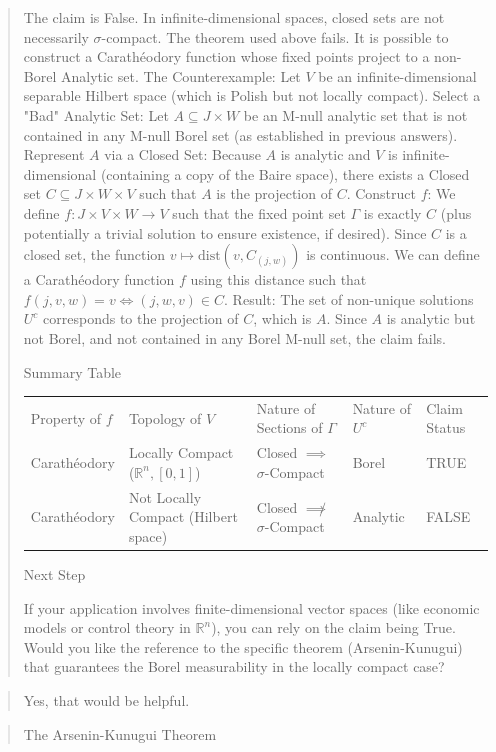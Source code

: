 \begin{Rem}
{\begin{quote}
The claim is False.
In infinite-dimensional spaces, closed sets are not necessarily $\sigma$-compact. The theorem used above fails. It is possible to construct a Carathéodory function whose fixed points project to a non-Borel Analytic set.
The Counterexample:
Let $V$ be an infinite-dimensional separable Hilbert space (which is Polish but not locally compact).
Select a "Bad" Analytic Set: Let $A \subseteq J \times W$ be an M-null analytic set that is not contained in any M-null Borel set (as established in previous answers).
Represent $A$ via a Closed Set:
Because $A$ is analytic and $V$ is infinite-dimensional (containing a copy of the Baire space), there exists a Closed set $C \subseteq J \times W \times V$ such that $A$ is the projection of $C$.
Construct $f$:
We define $f: J \times V \times W \to V$ such that the fixed point set $\Gamma$ is exactly $C$ (plus potentially a trivial solution to ensure existence, if desired).
Since $C$ is a closed set, the function $v \mapsto \text{dist}(v, C_{(j,w)})$ is continuous. We can define a Carathéodory function $f$ using this distance such that $f(j,v,w)=v \iff (j,w,v) \in C$.
Result:
The set of non-unique solutions $U^c$ corresponds to the projection of $C$, which is $A$.
Since $A$ is analytic but not Borel, and not contained in any Borel M-null set, the claim fails.

Summary Table

      \begin{tabular}{lllll}
      Property of $f$ & Topology of $V$ & Nature of Sections of $\Gamma$ & Nature of $U^c$ & Claim Status \\
        Carath\'eodory & Locally Compact ($\mathbb{R}^n, [0,1]$) & Closed $\implies$ $\sigma$-Compact & Borel & TRUE \\
        Carath\'eodory & Not Locally Compact (Hilbert space) & Closed $\not\implies$ $\sigma$-Compact & Analytic & FALSE
      \end{tabular}

Next Step

If your application involves finite-dimensional vector spaces (like economic models or control theory in $\mathbb{R}^n$), you can rely on the claim being True. Would you like the reference to the specific theorem (Arsenin-Kunugui) that guarantees the Borel measurability in the locally compact case?
    \end{quote}
    \begin{quote}
      Yes, that would be helpful.
    \end{quote}
    \begin{quote}
The Arsenin-Kunugui Theorem


\end{quote}}
\end{Rem}
